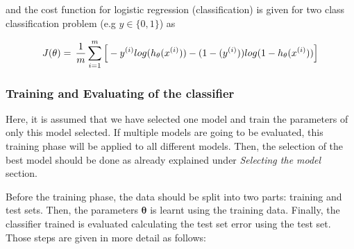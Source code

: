 and the cost function for logistic regression (classification) is given for two class classification problem (e.g $y \in \{0,1\}$) as 

\begin{equation}{\label{eqn:costFuncLogisticRegression}}
J(\theta)
=\,
\frac{1}{m} \sum\limits_{i=1}^{m} \Big[-y^{(i)}log(h_\theta(x^{(i)})) - (1-(y^{(i)}))log(1-h_\theta(x^{(i)}))\Big]
\end{equation} 

\subsubsection{Training and Evaluating of the classifier}

Here, it is assumed that we have selected one model and train the parameters of only this model selected. 
If multiple models are going to be evaluated, this training phase will be applied to all different models. 
Then, the selection of the best model should be done as already explained under \emph{Selecting the model} section.  

Before the training phase, the data should be split into two parts: training and test sets.
Then, the parameters $\bm{\theta}$ is learnt using the training data. 
Finally, the classifier trained is evaluated calculating the test set error using the test set.
Those steps are given in more detail as follows:
 
